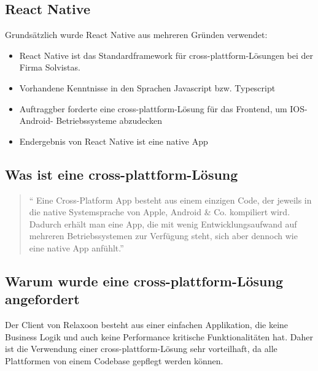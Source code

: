 \begin{spacing}{1}

    \section{React Native}

    Grundsätzlich wurde React Native aus mehreren Gründen verwendet:
    \begin{itemize}
        \item React Native ist das Standardframework für cross-plattform-Lösungen bei der Firma Solvistas.
        \item Vorhandene Kenntnisse in den Sprachen Javascript bzw. Typescript
        \item Auftraggber forderte eine cross-plattform-Lösung für das Frontend, um IOS- Android- Betriebssysteme abzudecken
        \item Endergebnis von React Native ist eine native App
    \end{itemize}




    \subsection{Was ist eine cross-plattform-Lösung}

    \begin{quotation}
        ``
        Eine Cross-Platform App besteht aus einem einzigen Code,
        der jeweils in die native Systemsprache von Apple, Android \& Co. kompiliert wird.
        Dadurch erhält man eine App, die mit wenig Entwicklungsaufwand auf mehreren
        Betriebssystemen zur Verfügung steht, sich aber dennoch wie eine native App
        anfühlt.''
        \cite{cross-plattform}

    \end{quotation}


    \subsection{Warum wurde eine cross-plattform-Lösung angefordert}
    Der Client von Relaxoon besteht aus einer einfachen Applikation, die keine Business Logik
    und auch keine Performance kritische Funktionalitäten hat.
    Daher ist die Verwendung einer cross-plattform-Lösung sehr vorteilhaft,
    da alle Plattformen von einem Codebase gepflegt werden können.




\end{spacing}
